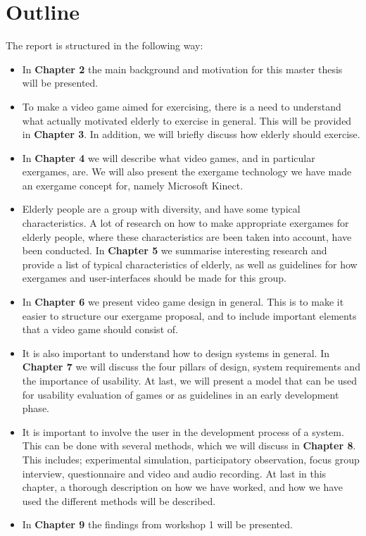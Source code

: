\section{Outline}
The report is structured in the following way:

\begin{itemize}
\item In \textbf{Chapter 2} the main background and motivation for this master thesis will be presented.
\item To make a video game aimed for exercising, there is a need to understand what actually motivated elderly to exercise in general. This will be provided in \textbf{Chapter 3}. In addition, we will briefly discuss how elderly should exercise.
\item In \textbf{Chapter 4} we will describe what video games, and in particular exergames, are. We will also present the exergame technology we have made an exergame concept for, namely Microsoft Kinect.
\item Elderly people are a group with diversity, and have some typical characteristics. A lot of research on how to make appropriate exergames for elderly people, where these characteristics are been taken into account, have been conducted. In \textbf{Chapter 5} we summarise interesting research and provide a list of typical characteristics of elderly, as well as guidelines for how exergames and user-interfaces should be made for this group.  
\item In \textbf{Chapter 6} we present video game design in general. This is to make it easier to structure our exergame proposal, and to include important elements that a video game should consist of.
\item It is also important to understand how to design systems in general. In \textbf{Chapter 7} we will discuss the four pillars of design, system requirements and the importance of usability. At last, we will present a model that can be used for usability evaluation of games or as guidelines in an early development phase. 
\item It is important to involve the user in the development process of a system. This can be done with several methods, which we will discuss in \textbf{Chapter 8}. This includes; experimental simulation, participatory observation, focus group interview, questionnaire and video and audio recording. At last in this chapter, a thorough description on how we have worked, and how we have used the different methods will be described.
\item In \textbf{Chapter 9} the findings from workshop 1 will be presented.

\end{itemize}
